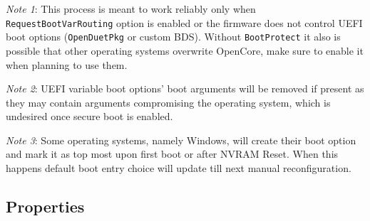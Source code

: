 \documentclass[]{article}
\begin{document}
\emph{Note 1}: This process is meant to work reliably only when \texttt{RequestBootVarRouting}
option is enabled or the firmware does not control UEFI boot options (\texttt{OpenDuetPkg} or
custom BDS). Without \texttt{BootProtect} it also is possible that other operating systems
overwrite OpenCore, make sure to enable it when planning to use them.

\emph{Note 2}: UEFI variable boot options' boot arguments will be removed if present as they
may contain arguments compromising the operating system, which is undesired once secure boot
is enabled.

\emph{Note 3}: Some operating systems, namely Windows, will create their boot option and
mark it as top most upon first boot or after NVRAM Reset. When this happens default boot
entry choice will update till next manual reconfiguration.

\subsection{Properties}\label{miscprops}
\end{document}
